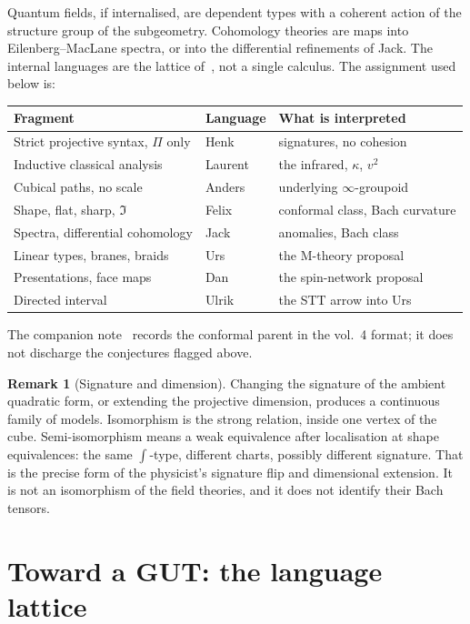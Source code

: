 \documentclass{article}
\theoremstyle{definition}
\newtheorem{remark}{Remark}
\newcommand{\shape}{\int}
\begin{document}
Quantum fields, if internalised, are dependent types with a coherent action
of the structure group of the subgeometry.  Cohomology theories are maps into
Eilenberg--MacLane spectra, or into the differential refinements of Jack.
The internal languages are the lattice of~\cite{GIArch}, not a single
calculus.  The assignment used below is:
\begin{center}
\begin{tabular}{lll}
\hline
Fragment & Language & What is interpreted \\
\hline
Strict projective syntax, \(\Pi\) only & Henk & signatures, no cohesion \\
Inductive classical analysis & Laurent & the infrared, \(\kappa\), \(v^2\) \\
Cubical paths, no scale & Anders & underlying \(\infty\)-groupoid \\
Shape, flat, sharp, \(\Im\) & Felix & conformal class, Bach curvature \\
Spectra, differential cohomology & Jack & anomalies, Bach class \\
Linear types, branes, braids & Urs & the M-theory proposal \\
Presentations, face maps & Dan & the spin-network proposal \\
Directed interval & Ulrik & the STT arrow into Urs \\
\hline
\end{tabular}
\end{center}
The companion
note~\cite{TonpaConf} records the conformal parent in the vol.~4 format; it
does not discharge the conjectures flagged above.

\begin{remark}[Signature and dimension]
Changing the signature of the ambient quadratic form, or extending the
projective dimension, produces a continuous family of models.  Isomorphism
is the strong relation, inside one vertex of the cube.  Semi-isomorphism
means a weak equivalence after localisation at shape equivalences: the same
\(\shape\)-type, different charts, possibly different signature.  That is the
precise form of the physicist's signature flip and dimensional extension.
It is not an isomorphism of the field theories, and it does not identify
their Bach tensors.
\end{remark}

\section{Toward a GUT: the language lattice}
\end{document}
